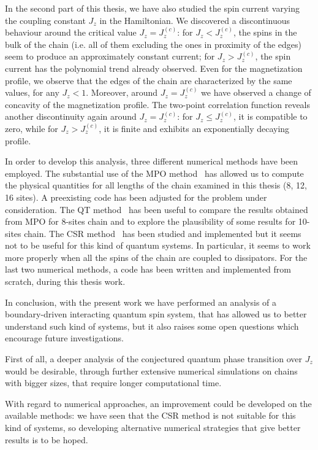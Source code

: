 In the second part of this thesis, we have also studied the spin current varying the coupling constant $J_z$ in the Hamiltonian. We discovered a discontinuous behaviour around the critical value $J_z = J_z^{(c)}$: for $J_z < J_z^{(c)}$, %
the spins in the bulk of the chain (i.e. all of them excluding the ones in proximity of the edges) seem to produce an approximately constant current; for $J_z > J_z^{(c)}$, the spin current has the polynomial trend already observed. Even for the magnetization profile, we observe that the edges of the chain are characterized by the same values, for any $J_z<1$. Moreover, around $J_z = J_z^{(c)}$ we have observed a change of concavity of the magnetization profile. The two-point correlation function reveals another discontinuity again around $J_z = J_z^{(c)}$: for $J_z \leq J_z^{(c)}$, it is compatible to zero, while for $J_z > J_z^{(c)}$, it is finite and exhibits an exponentially decaying profile.

In order to develop this analysis, three different numerical methods have been employed.  The substantial use of the MPO method~\cite{MPO_method} has allowed us to compute the physical quantities for all lengths of the chain examined in this thesis (8, 12, 16 sites). A preexisting code has been adjusted for the problem under consideration. The QT method~\cite{PhysRevLett.68.580} has been useful to compare the results obtained from MPO for 8-sites chain and to explore the plausibility of some results for 10-sites chain. The CSR method~\cite{PhysRevLett.115.080604} has been studied and implemented but it seems not to be useful for this kind of quantum systems. In particular, it seems to work more properly when all the spins of the chain are coupled to dissipators. For the last two numerical methods, a code has been written and implemented from scratch, during this thesis work.

In conclusion, with the present work we have performed an analysis of a boundary-driven interacting quantum spin system, that
has allowed us to better understand such kind of systems, but it also raises some open questions which encourage future investigations.

First of all, a deeper analysis of the conjectured quantum phase transition over $J_z$ would be desirable, through further extensive numerical simulations on chains with bigger sizes, that require longer computational time.

With regard to numerical approaches, an improvement could be developed on the available methods: we have seen that the CSR method is not suitable for this kind of systems, so developing alternative numerical strategies that give better results is to be hoped.

